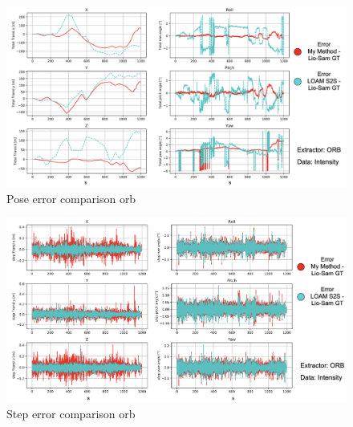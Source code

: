 {    \begin{figure}[ht]
        \centering
        \includegraphics[scale = 0.25]{images/comparison_appendix/pose_error_orb.png}
        \caption{Pose error comparison orb}
        \label{fig:pose_error_comparison_orb}
    \end{figure}
    \clearpage
    
    \begin{figure}[ht]
        \centering
        \includegraphics[scale = 0.25]{images/comparison_appendix/step_error_orb.png}
        \caption{Step error comparison orb}
        \label{fig:step_error_comparison_orb}
    \end{figure}
    \clearpage
}
    



